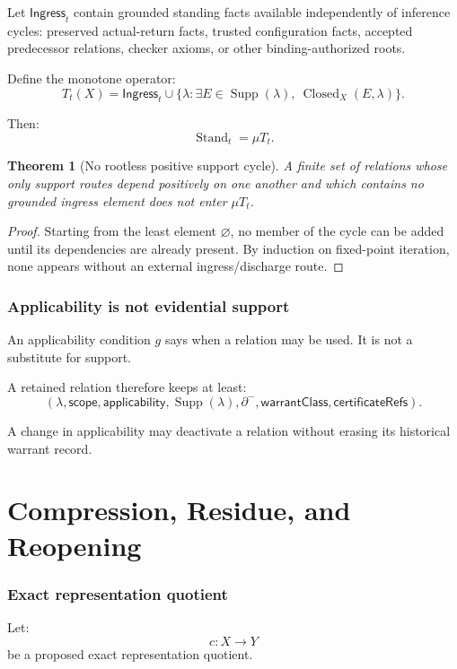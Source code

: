 \documentclass[11pt,oneside]{article}
\newtheorem{theorem}[definition]{Theorem}
\newcommand{\Stand}{\operatorname{Stand}}
\newcommand{\Supp}{\operatorname{Supp}}
\newcommand{\Closed}{\operatorname{Closed}}
\begin{document}
Let \(\mathsf{Ingress}_t\) contain grounded standing facts available independently of inference cycles: preserved actual-return facts, trusted configuration facts, accepted predecessor relations, checker axioms, or other binding-authorized roots.

Define the monotone operator:
\[
\boxed{
T_t(X)
=
\mathsf{Ingress}_t
\cup
\{
\lambda:
\exists E\in\Supp(\lambda),\
\Closed_X(E,\lambda)
\}.
}
\]

Then:
\[
\boxed{
\Stand_t
=
\mu T_t.
}
\]

\begin{theorem}[No rootless positive support cycle]
A finite set of relations whose only support routes depend positively on one another and which contains no grounded ingress element does not enter \(\mu T_t\).
\end{theorem}

\begin{proof}
Starting from the least element \(\varnothing\), no member of the cycle can be added until its dependencies are already present.  By induction on fixed-point iteration, none appears without an external ingress/discharge route.
\end{proof}

\section{Applicability is not evidential support}

An applicability condition \(g\) says when a relation may be used.  It is not a substitute for support.

A retained relation therefore keeps at least:
\[
\boxed{
(
\lambda,
\mathsf{scope},
\mathsf{applicability},
\Supp(\lambda),
\partial^-,
\mathsf{warrantClass},
\mathsf{certificateRefs}
).
}
\]

A change in applicability may deactivate a relation without erasing its historical warrant record.

\part{Compression, Residue, and Reopening}

\section{Exact representation quotient}

Let:
\[
c:X\to Y
\]
be a proposed exact representation quotient.
\end{document}
